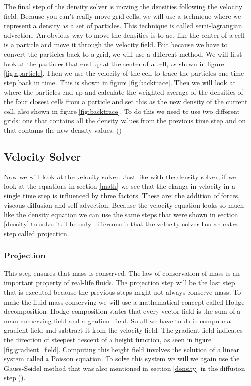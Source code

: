 \documentclass[a4paper,12pt,titlepage]{article}
\begin{document}
The final step of the density solver is moving the densities following the velocity
field. Because you can't really move grid cells, we will use a technique where we
represent a density as a set of particles. This technique is called semi-lagrangian
advection. An obvious way to move the densities is to act like the center of a
cell is a particle and move it through the velocity field. But because we have
to convert the particles back to a grid, we will use a different method. We will
first look at the particles that end up at the center of a cell, as shown in
figure \ref{fig:aparticle}. Then we use the velocity of the cell to trace the particles
one time step back in time. This is shown in figure \ref{fig:backtrace}. Then we will
look at where the particles end up and calculate the weighted average of the
densities of the four closest cells from a particle and set this as the new density
of the current cell, also shown in figure \ref{fig:backtrace}. To do this we need to use
two different grids: one that contains all the density values from the previous
time step and on that contains the new density values. (\cite{josstam})
 
\subsection{Velocity Solver} \label{velocity}
Now we will look at the velocity solver. Just like with the density solver, if we
look at the equations in section \ref{math} we see that the change in velocity
in a single time step is influenced by three factors. These are: the addition of
forces, viscous diffusion and self-advection. Because the velocity equation
looks so much like the density equation we can use the same steps that were shown
in section \ref{density} to solve it. The only difference is that the velocity
solver has an extra step called projection.

\subsubsection{Projection} \label{projectionstep}
This step ensures that mass is conserved. 
The law of conservation of mass is an important property of real-life fluids.
The projection step will be the last step that is executed because the previous
steps might not always conserve mass. To make the fluid mass conserving we will
use a mathematical concept called Hodge decomposition. Hodge composition states
that every vector field is the sum of a mass conserving field and a gradient field.
So all we have to do is compute a gradient field and subtract it from the velocity
field. The gradient field indicates the direction of steepest descent of a height function, as seen in figure \ref{fig:gradient_field}.
Computing this height field involves the solution of a linear system called a Poisson equation.
To solve this system we will we again use the Gauss-Seidel method that was also mentioned in section \ref{density} in the diffusion step (\cite{josstam}).
\end{document}
